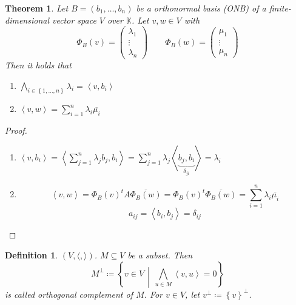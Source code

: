 \documentclass[a4paper,landscape,twocolumn]{article}
\newcommand\set[1]{\left\{#1\right\}}
\newcommand\setdef[2]{\left\{#1\,\middle|\,#2\right\}}
\newcommand\functional[1]{\left\langle{#1}\right\rangle}
\newtheorem{theorem}{Theorem}
\newtheorem{defi}{Definition}
\begin{document}
\begin{theorem}
  \label{satz-8.39}
  Let $B = (b_1, \ldots, b_n)$ be a orthonormal basis (ONB)
  of a finite-dimensional vector space $V$ over $\mathbb K$.
  Let $v,w \in V$ with
  \[
    \Phi_B(v) = \begin{pmatrix} \lambda_1 \\ \vdots \\ \lambda_n \end{pmatrix}
    \qquad
    \Phi_B(w) = \begin{pmatrix} \mu_1 \\ \vdots \\ \mu_n \end{pmatrix}
  \]
  Then it holds that
  \begin{enumerate}
    \item $\bigwedge_{i \in \set{1,\ldots,n}} \lambda_i = \functional{v,b_i}$
    \item $\functional{v,w} = \sum_{i=1}^n \lambda_i \overline{\mu_i}$
  \end{enumerate}
\end{theorem}
\begin{proof}
  \begin{enumerate}
    \item $\functional{v,b_i} = \functional{\sum_{j=1}^n \lambda_j b_j, b_i} = \sum_{j=1}^n \lambda_j \functional{\underbrace{b_j, b_i}_{\delta_{ji}}} = \lambda_i$
    \item
      \[
        \functional{v,w} = \Phi_B(v)^t A \overline{\Phi_B(w)} = \Phi_B(v)^t \overline{\Phi_B(w)} = \sum_{i=1}^n \lambda_i \overline{\mu_i}
      \] \[
        a_{ij} = \functional{b_i, b_j} = \delta_{ij}
      \]
  \end{enumerate}
\end{proof}

\begin{defi}
  \label{defi-8.40}
  $(V, \langle, \rangle)$. $M \subseteq V$ be a subset.
  Then
  \[ M^\bot \coloneqq \setdef{v \in V}{\bigwedge_{u \in M} \functional{v,u} = 0} \]
  is called \emph{orthogonal complement} of $M$. For $v \in V$, let $v^\bot \coloneqq \set{v}^\bot$.
\end{defi}
\end{document}
